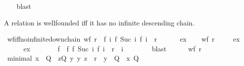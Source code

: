 \begin{isabellebody}
%
\isadelimproof
\ \ %
\endisadelimproof
%
\isatagproof
{}\isamarkupfalse%
\ blast%
\endisatagproof
{\isafoldproof}%
%
\isadelimproof
%
\endisadelimproof
%
\begin{isamarkuptext}%
A relation is wellfounded iff it has no infinite descending chain.%
\end{isamarkuptext}\isamarkuptrue%
\isamarkupfalse%
\ wf{\isacharunderscore}{\kern0pt}iff{\isacharunderscore}{\kern0pt}no{\isacharunderscore}{\kern0pt}infinite{\isacharunderscore}{\kern0pt}down{\isacharunderscore}{\kern0pt}chain{\isacharcolon}{\kern0pt}\ {\isachardoublequoteopen}wf\ r\ {\isasymlongleftrightarrow}\ {\isacharparenleft}{\kern0pt}{\isasymnexists}f{\isachardot}{\kern0pt}\ {\isasymforall}i{\isachardot}{\kern0pt}\ {\isacharparenleft}{\kern0pt}f\ {\isacharparenleft}{\kern0pt}Suc\ i{\isacharparenright}{\kern0pt}{\isacharcomma}{\kern0pt}\ f\ i{\isacharparenright}{\kern0pt}\ {\isasymin}\ r{\isacharparenright}{\kern0pt}{\isachardoublequoteclose}\isanewline
\ \ {\isacharparenleft}{\kern0pt}\ {\isachardoublequoteopen}{\isacharunderscore}{\kern0pt}\ {\isasymlongleftrightarrow}\ {\isasymnot}\ {\isacharquery}{\kern0pt}ex{\isachardoublequoteclose}{\isacharparenright}{\kern0pt}\isanewline
%
\isadelimproof
%
\endisadelimproof
%
\isatagproof
{}\isamarkupfalse%
\isanewline
\ \ \isamarkupfalse%
\ {\isachardoublequoteopen}wf\ r{\isachardoublequoteclose}\isanewline
\ \ \isamarkupfalse%
\ {\isachardoublequoteopen}{\isasymnot}\ {\isacharquery}{\kern0pt}ex{\isachardoublequoteclose}\isanewline
\ \ \isamarkupfalse%
\isanewline
\ \ \ \ \isamarkupfalse%
\ {\isacharquery}{\kern0pt}ex\isanewline
\ \ \ \ \isamarkupfalse%
\ \isamarkupfalse%
\ f\ \ f{\isacharcolon}{\kern0pt}\ {\isachardoublequoteopen}{\isacharparenleft}{\kern0pt}f\ {\isacharparenleft}{\kern0pt}Suc\ i{\isacharparenright}{\kern0pt}{\isacharcomma}{\kern0pt}\ f\ i{\isacharparenright}{\kern0pt}\ {\isasymin}\ r{\isachardoublequoteclose}\ \ i\isanewline
\ \ \ \ \ \ \isamarkupfalse%
\ blast\isanewline
\ \ \ \ \isamarkupfalse%
\ {\isacartoucheopen}wf\ r{\isacartoucheclose}\ \isamarkupfalse%
\ minimal{\isacharcolon}{\kern0pt}\ {\isachardoublequoteopen}x\ {\isasymin}\ Q\ {\isasymLongrightarrow}\ {\isasymexists}z{\isasymin}Q{\isachardot}{\kern0pt}\ {\isasymforall}y{\isachardot}{\kern0pt}\ {\isacharparenleft}{\kern0pt}y{\isacharcomma}{\kern0pt}\ z{\isacharparenright}{\kern0pt}\ {\isasymin}\ r\ {\isasymlongrightarrow}\ y\ {\isasymnotin}\ Q{\isachardoublequoteclose}\ \ x\ Q\isanewline

\end{isabellebody}
